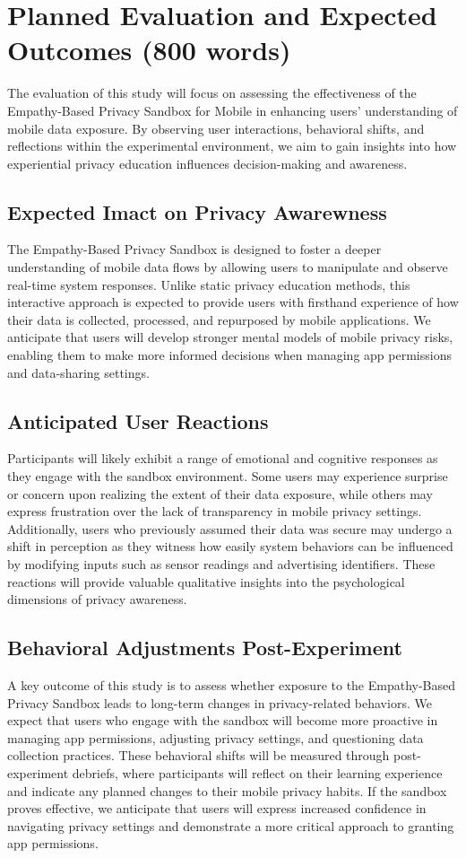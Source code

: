 \documentclass[acmlarge, nonacm]{acmart}
\begin{document}
\section{Planned Evaluation and Expected Outcomes (800 words)}
The evaluation of this study will focus on assessing the effectiveness of the Empathy-Based Privacy Sandbox for Mobile in enhancing users' understanding of mobile data exposure. By observing user interactions, behavioral shifts, and reflections within the experimental environment, we aim to gain insights into how experiential privacy education influences decision-making and awareness.

\subsection{Expected Imact on Privacy Awarewness}

The Empathy-Based Privacy Sandbox is designed to foster a deeper understanding of mobile data flows by allowing users to manipulate and observe real-time system responses. Unlike static privacy education methods, this interactive approach is expected to provide users with firsthand experience of how their data is collected, processed, and repurposed by mobile applications. We anticipate that users will develop stronger mental models of mobile privacy risks, enabling them to make more informed decisions when managing app permissions and data-sharing settings.

\subsection{Anticipated User Reactions}
Participants will likely exhibit a range of emotional and cognitive responses as they engage with the sandbox environment. Some users may experience surprise or concern upon realizing the extent of their data exposure, while others may express frustration over the lack of transparency in mobile privacy settings. Additionally, users who previously assumed their data was secure may undergo a shift in perception as they witness how easily system behaviors can be influenced by modifying inputs such as sensor readings and advertising identifiers. These reactions will provide valuable qualitative insights into the psychological dimensions of privacy awareness.

\subsection{Behavioral Adjustments Post-Experiment}
A key outcome of this study is to assess whether exposure to the Empathy-Based Privacy Sandbox leads to long-term changes in privacy-related behaviors. We expect that users who engage with the sandbox will become more proactive in managing app permissions, adjusting privacy settings, and questioning data collection practices. These behavioral shifts will be measured through post-experiment debriefs, where participants will reflect on their learning experience and indicate any planned changes to their mobile privacy habits. If the sandbox proves effective, we anticipate that users will express increased confidence in navigating privacy settings and demonstrate a more critical approach to granting app permissions.
\end{document}
